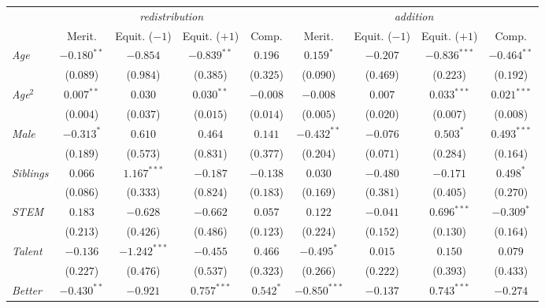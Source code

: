 \begin{table}[htpb]
\centering
\footnotesize
\setlength{\tabcolsep}{5pt}
\begin{tabular}{l cccc | cccc}
\toprule
 & \multicolumn{4}{c}{\textit{redistribution}} & \multicolumn{4}{c}{\textit{addition}} \\
\cmidrule(lr){2-5} \cmidrule(lr){6-9}
 & Merit. & \shortstack{Equit.\\($-1$)} & \shortstack{Equit.\\($+1$)} & Comp. & Merit. & \shortstack{Equit.\\($-1$)} & \shortstack{Equit.\\($+1$)} & Comp. \\
\midrule
\textit{Age} & $-0.180^{**}$ & $-0.854$ & $-0.839^{**}$ & $0.196$ & $0.159^{*}$ & $-0.207$ & $-0.836^{***}$ & $-0.464^{**}$ \\
           & ($0.089$) & ($0.984$) & ($0.385$) & ($0.325$) & ($0.090$) & ($0.469$) & ($0.223$) & ($0.192$) \\
\textit{Age}$^2$ & $0.007^{**}$ & $0.030$ & $0.030^{**}$ & $-0.008$ & $-0.008$ & $0.007$ & $0.033^{***}$ & $0.021^{***}$ \\
           & ($0.004$) & ($0.037$) & ($0.015$) & ($0.014$) & ($0.005$) & ($0.020$) & ($0.007$) & ($0.008$) \\
\textit{Male} & $-0.313^{*}$ & $0.610$ & $0.464$ & $0.141$ & $-0.432^{**}$ & $-0.076$ & $0.503^{*}$ & $0.493^{***}$ \\
           & ($0.189$) & ($0.573$) & ($0.831$) & ($0.377$) & ($0.204$) & ($0.071$) & ($0.284$) & ($0.164$) \\
\textit{Siblings} & $0.066$ & $1.167^{***}$ & $-0.187$ & $-0.138$ & $0.030$ & $-0.480$ & $-0.171$ & $0.498^{*}$ \\
           & ($0.086$) & ($0.333$) & ($0.824$) & ($0.183$) & ($0.169$) & ($0.381$) & ($0.405$) & ($0.270$) \\
\textit{STEM} & $0.183$ & $-0.628$ & $-0.662$ & $0.057$ & $0.122$ & $-0.041$ & $0.696^{***}$ & $-0.309^{*}$ \\
           & ($0.213$) & ($0.426$) & ($0.486$) & ($0.123$) & ($0.224$) & ($0.152$) & ($0.130$) & ($0.164$) \\
\textit{Talent} & $-0.136$ & $-1.242^{***}$ & $-0.455$ & $0.466$ & $-0.495^{*}$ & $0.015$ & $0.150$ & $0.079$ \\
           & ($0.227$) & ($0.476$) & ($0.537$) & ($0.323$) & ($0.266$) & ($0.222$) & ($0.393$) & ($0.433$) \\
\textit{Better} & $-0.430^{**}$ & $-0.921$ & $0.757^{***}$ & $0.542^{*}$ & $-0.850^{***}$ & $-0.137$ & $0.743^{***}$ & $-0.274$ \\

\end{tabular}
\end{table}
